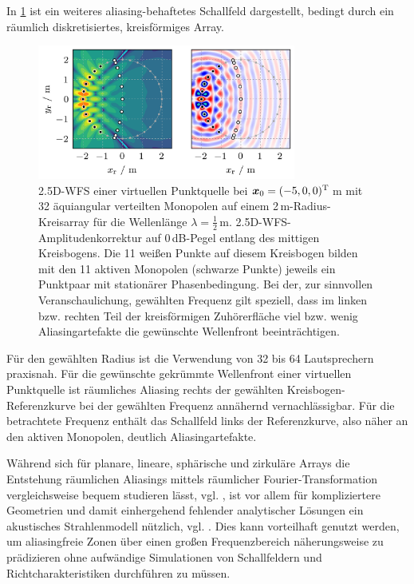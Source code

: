 In \Abb\ref{fig:wfs25d_circSSD_aliasing} ist ein weiteres aliasing-behaftetes
Schallfeld dargestellt, bedingt durch ein räumlich diskretisiertes,
kreisförmiges Array.
%
\begin{figure}[t]
\centering
\begin{plotfigures}
\includegraphics[width=85mm]{../python/wfs25d_circSSD_aliasing.png}
\end{plotfigures}
\caption{2.5D-WFS einer virtuellen Punktquelle bei $\bm{x}_\mathrm{0} = (-5,0,0)^\mathrm{T}$\,m
mit 32 äquiangular verteilten Monopolen auf einem 2\,m-Radius-Kreisarray
für die Wellenlänge $\lambda=\frac{1}{2}$\,m.
%
2.5D-WFS-Amplitudenkorrektur auf $0$\,dB-Pegel entlang des mittigen Kreisbogens.
%
Die 11 weißen Punkte auf diesem Kreisbogen bilden mit den 11 aktiven Monopolen
(schwarze Punkte) jeweils ein Punktpaar mit stationärer Phasenbedingung.
%
Bei der, zur sinnvollen Veranschaulichung, gewählten Frequenz gilt speziell, dass
im linken bzw. rechten Teil der kreisförmigen Zuhörerfläche viel bzw. wenig
Aliasingartefakte die gewünschte Wellenfront beeinträchtigen.
%
\cc
}
\label{fig:wfs25d_circSSD_aliasing}
\end{figure}
%
Für den gewählten Radius ist die Verwendung von 32 bis 64 Lautsprechern
praxisnah.
%
Für die gewünschte gekrümmte Wellenfront einer virtuellen Punktquelle
ist räumliches Aliasing rechts der gewählten Kreisbogen-Referenzkurve
bei der gewählten Frequenz annähernd vernachlässigbar.
%
Für die betrachtete Frequenz enthält das Schallfeld links der Referenzkurve,
also näher an den aktiven Monopolen, deutlich Aliasingartefakte.



Während sich für planare, lineare, sphärische und zirkuläre Arrays
die Entstehung räumlichen Aliasings mittels räumlicher Fourier-Transformation
vergleichsweise bequem studieren lässt,
vgl. \cite{Start1997_diss,Spors2008b,Ahrens2010_IEEE,Fazi2010,Schultz2016_diss},
ist vor allem für kompliziertere Geometrien und damit einhergehend fehlender
analytischer Lösungen ein akustisches Strahlenmodell
nützlich, vgl. \cite{Winter2019_diss}.
%
Dies kann vorteilhaft genutzt werden, um aliasingfreie Zonen über einen großen
Frequenzbereich näherungsweise zu prädizieren ohne aufwändige Simulationen von
Schallfeldern und Richtcharakteristiken durchführen zu müssen.




